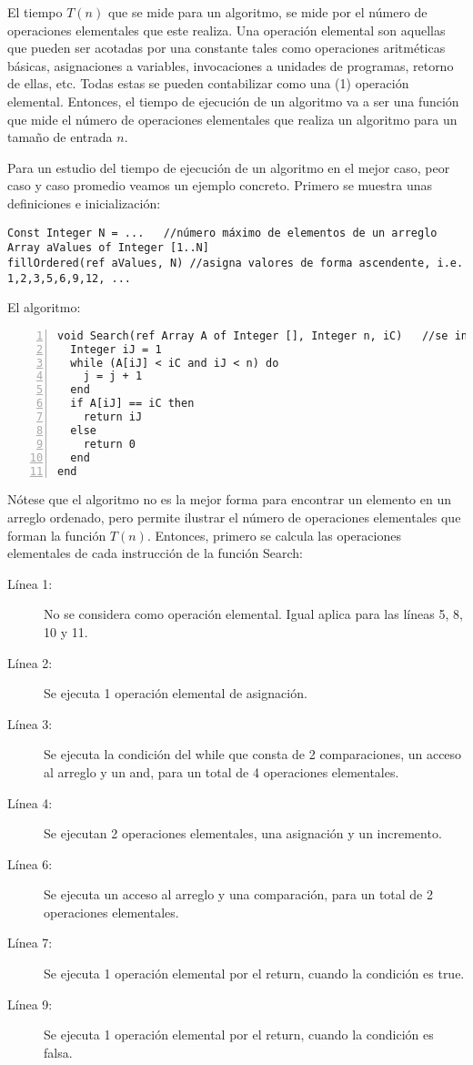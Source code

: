 El tiempo $T(n)$ que se mide para un algoritmo, se mide por el número de operaciones elementales que este realiza. Una operación elemental son aquellas que pueden ser acotadas por una constante tales como operaciones aritméticas básicas, asignaciones a variables, invocaciones a unidades de programas, retorno de ellas, etc. Todas estas se pueden contabilizar como una (1) operación elemental. Entonces, el tiempo de ejecución de un algoritmo va a ser una función que mide el número de operaciones elementales que realiza un algoritmo para un tamaño de entrada $n$.

Para un estudio del tiempo de ejecución de un algoritmo en el mejor caso, peor caso y caso promedio veamos un ejemplo concreto. Primero se muestra unas definiciones e inicialización:

\begin{lstlisting}[upquote=true, language=pseudo]
Const Integer N = ...	//número máximo de elementos de un arreglo
Array aValues of Integer [1..N]
fillOrdered(ref aValues, N)	//asigna valores de forma ascendente, i.e. 1,2,3,5,6,9,12, ...
\end{lstlisting}

El algoritmo:

\begin{lstlisting}[upquote=true, language=pseudo, numbers=left]
void Search(ref Array A of Integer [], Integer n, iC)	//se intenta buscar iC en el arreglo
  Integer iJ = 1
  while (A[iJ] < iC and iJ < n) do
    j = j + 1
  end
  if A[iJ] == iC then
    return iJ
  else
    return 0
  end
end
\end{lstlisting}

Nótese que el algoritmo no es la mejor forma para encontrar un elemento en un arreglo ordenado, pero permite ilustrar el número de operaciones elementales que forman la función $T(n)$. Entonces, primero se calcula las operaciones elementales de cada instrucción de la función Search:

\begin{description}
\item [Línea 1:] No se considera como operación elemental. Igual aplica para las líneas 5, 8, 10 y 11.
\item [Línea 2:] Se ejecuta 1 operación elemental de asignación.
\item [Línea 3:] Se ejecuta la condición del while que consta de 2 comparaciones, un acceso al arreglo y un and, para un total de 4 operaciones elementales.
\item [Línea 4:] Se ejecutan 2 operaciones elementales, una asignación y un incremento.
\item [Línea 6:] Se ejecuta un acceso al arreglo y una comparación, para un total de 2 operaciones elementales.
\item [Línea 7:] Se ejecuta 1 operación elemental por el return, cuando la condición es true.
\item [Línea 9:] Se ejecuta 1 operación elemental por el return, cuando la condición es falsa.
\end{description}

